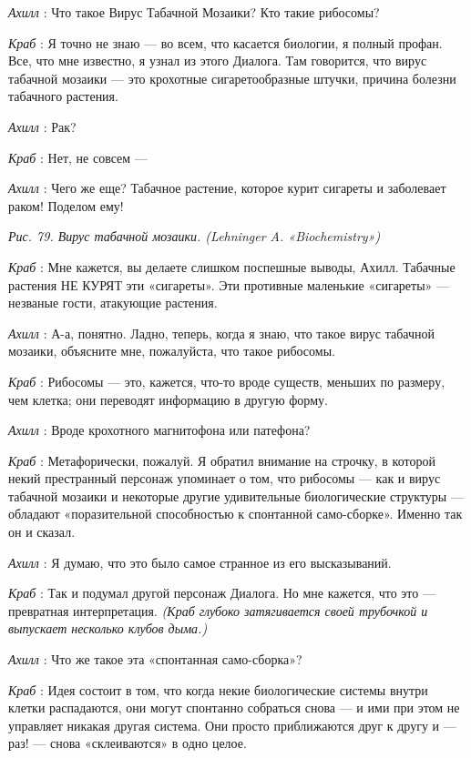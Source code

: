 \documentclass[../main.tex]{subfiles}
\begin{document}
\begin{dialogue}
\emph{Ахилл} : Что такое Вирус Табачной Мозаики? Кто такие рибосомы?

\emph{Краб} : Я точно не знаю --- во всем, что касается биологии, я полный профан. Все, что мне известно, я узнал из этого Диалога. Там говорится, что вирус табачной мозаики --- это крохотные сигаретообразные штучки, причина болезни табачного растения.

\emph{Ахилл} : Рак?

\emph{Краб} : Нет, не совсем ---

\emph{Ахилл} : Чего же еще? Табачное растение, которое курит сигареты и заболевает раком! Поделом ему!

\emph{Рис. 79. Вирус табачной мозаики. (Lehninger A. «Biochemistry»)}

\emph{Краб} : Мне кажется, вы делаете слишком поспешные выводы, Ахилл. Табачные растения НЕ КУРЯТ эти «сигареты». Эти противные маленькие «сигареты» --- незваные гости, атакующие растения.

\emph{Ахилл} : А-а, понятно. Ладно, теперь, когда я знаю, что такое вирус табачной мозаики, объясните мне, пожалуйста, что такое рибосомы.

\emph{Краб} : Рибосомы --- это, кажется, что-то вроде существ, меньших по размеру, чем клетка; они переводят информацию в другую форму.

\emph{Ахилл} : Вроде крохотного магнитофона или патефона?

\emph{Краб} : Метафорически, пожалуй. Я обратил внимание на строчку, в которой некий престранный персонаж упоминает о том, что рибосомы --- как и вирус табачной мозаики и некоторые другие удивительные биологические структуры --- обладают «поразительной способностью к спонтанной само-сборке». Именно так он и сказал.

\emph{Ахилл} : Я думаю, что это было самое странное из его высказываний.

\emph{Краб} : Так и подумал другой персонаж Диалога. Но мне кажется, что это --- превратная интерпретация. \emph{(Краб глубоко затягивается своей трубочкой и выпускает несколько клубов дыма.)}

\emph{Ахилл} : Что же такое эта «спонтанная само-сборка»?

\emph{Краб} : Идея состоит в том, что когда некие биологические системы внутри клетки распадаются, они могут спонтанно собраться снова --- и ими при этом не управляет никакая другая система. Они просто приближаются друг к другу и --- раз! --- снова «склеиваются» в одно целое.


\end{dialogue}
\end{document}
